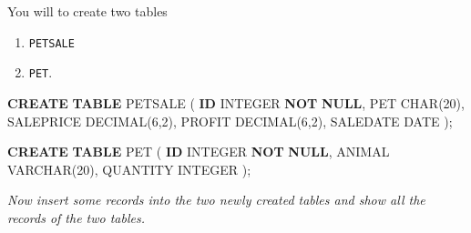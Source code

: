 \documentclass[
]{book}
\newenvironment{Shaded}{\begin{snugshade}}{\end{snugshade}}
\newcommand{\DataTypeTok}[1]{\textcolor[rgb]{0.13,0.29,0.53}{#1}}
\newcommand{\DecValTok}[1]{\textcolor[rgb]{0.00,0.00,0.81}{#1}}
\newcommand{\KeywordTok}[1]{\textcolor[rgb]{0.13,0.29,0.53}{\textbf{#1}}}
\newcommand{\NormalTok}[1]{#1}
\begin{document}
You will to create two tables

\begin{enumerate}
\def\labelenumi{\arabic{enumi}.}
\item
  \texttt{PETSALE}
\item
  \texttt{PET}.
\end{enumerate}

\begin{Shaded}
\begin{Highlighting}[]
\KeywordTok{CREATE} \KeywordTok{TABLE}\NormalTok{ PETSALE (}
    \KeywordTok{ID} \DataTypeTok{INTEGER} \KeywordTok{NOT} \KeywordTok{NULL}\NormalTok{,}
\NormalTok{    PET }\DataTypeTok{CHAR}\NormalTok{(}\DecValTok{20}\NormalTok{),}
\NormalTok{    SALEPRICE }\DataTypeTok{DECIMAL}\NormalTok{(}\DecValTok{6}\NormalTok{,}\DecValTok{2}\NormalTok{),}
\NormalTok{    PROFIT }\DataTypeTok{DECIMAL}\NormalTok{(}\DecValTok{6}\NormalTok{,}\DecValTok{2}\NormalTok{),}
\NormalTok{    SALEDATE }\DataTypeTok{DATE}
\NormalTok{    );}
    
\KeywordTok{CREATE} \KeywordTok{TABLE}\NormalTok{ PET (}
    \KeywordTok{ID} \DataTypeTok{INTEGER} \KeywordTok{NOT} \KeywordTok{NULL}\NormalTok{,}
\NormalTok{    ANIMAL }\DataTypeTok{VARCHAR}\NormalTok{(}\DecValTok{20}\NormalTok{),}
\NormalTok{    QUANTITY }\DataTypeTok{INTEGER}
\NormalTok{    );}
\end{Highlighting}
\end{Shaded}

{\emph{Now insert some records into the two newly created tables and show all the records of the two tables. }}
\end{document}
